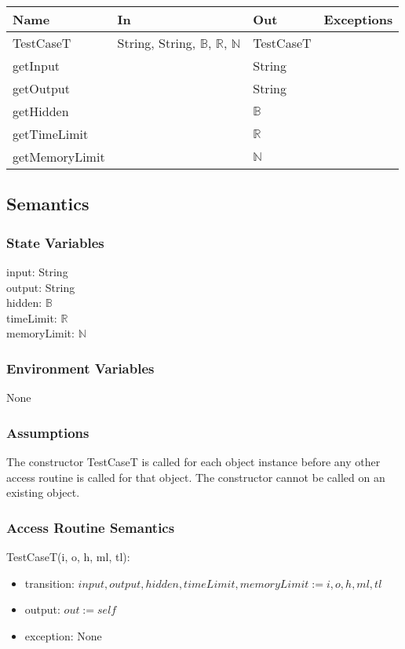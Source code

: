 \documentclass[12pt, titlepage]{article}
\begin{document}
\begin{center}
\begin{tabular}{ |  p{4cm} | p{3cm} |  p{3cm} | p{5cm} | }
\hline
\textbf{Name} & \textbf{In} & \textbf{Out} & \textbf{Exceptions} \\
\hline
TestCaseT & String, String, $\mathbb{B}$, $\mathbb{R}$, $\mathbb{N}$ & TestCaseT & \\
getInput & & String & \\
getOutput & & String & \\
getHidden & & $\mathbb{B}$ & \\
getTimeLimit & & $\mathbb{R}$  & \\
getMemoryLimit & & $\mathbb{N}$ & \\

\hline
\end{tabular}
\end{center}

\subsection{Semantics}

\subsubsection{State Variables}
input: String\\
output: String\\
hidden: $\mathbb{B}$\\
timeLimit: $\mathbb{R}$\\
memoryLimit: $\mathbb{N}$

\subsubsection{Environment Variables}
None

\subsubsection{Assumptions}
The constructor TestCaseT is called for each object instance before any other access routine is called for that object. The constructor cannot be called on an existing object.

\subsubsection{Access Routine Semantics}

\noindent TestCaseT(i, o, h, ml, tl):
\begin{itemize}
\item transition: $input, output, hidden, timeLimit, memoryLimit := i, o, h, ml, tl$
\item output: $out := self$
\item exception: None
\end{itemize}
\end{document}
